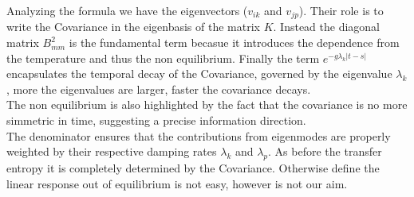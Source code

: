 \documentclass[English, Lau, oneside]{sapthesis}
\begin{document}
Analyzing the formula we have the eigenvectors (\( v_{ik} \) and \( v_{jp} \)). Their role is to write the Covariance in the eigenbasis of the matrix \( {K} \). Instead the diagonal matrix \( B_{mm}^2 \) is the fundamental term becasue it introduces the dependence from the temperature and thus the non equilibrium.
Finally the term \( e^{-g \lambda_k |t-s|} \) encapsulates the temporal decay of the Covariance, governed by the eigenvalue \( \lambda_k \), more the eigenvalues are larger,  faster the covariance decays.\\ 
The non equilibrium is also highlighted by the fact that the covariance is no more simmetric in time, suggesting a precise information direction. \\
The denominator ensures that the contributions from eigenmodes are properly weighted by their respective damping rates \( \lambda_k \) and \( \lambda_p \).
As before the transfer entropy it is completely determined by the Covariance.
Otherwise define the linear response out of equilibrium is not easy, however is not our aim.


\newpage
\end{document}
